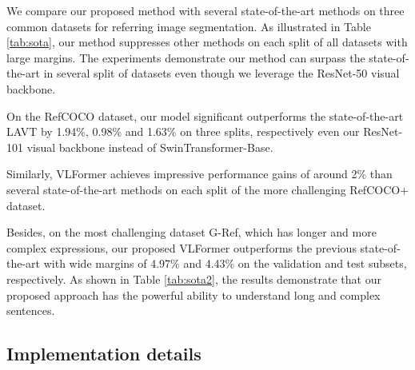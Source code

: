 


We compare our proposed method with several state-of-the-art methods on three common datasets for referring image segmentation. As illustrated in Table \ref{tab:sota}, our method suppresses other methods on each split of all datasets with large margins. The experiments demonstrate our method can surpass the state-of-the-art in several split of datasets even though we leverage the ResNet-50 visual backbone\cite{he_deep_2016}. 

On the RefCOCO dataset, our model significant outperforms the state-of-the-art LAVT\cite{yang_lavt_2022} by 1.94\%, 0.98\% and 1.63\% on three splits, respectively even our ResNet-101 visual backbone instead of SwinTransformer-Base. 

Similarly, VLFormer achieves impressive performance gains of around 2\% than several state-of-the-art methods on each split of the more challenging RefCOCO+ dataset.

Besides, on the most challenging dataset G-Ref, which has longer and more complex expressions, our proposed VLFormer outperforms the previous state-of-the-art with wide margins of 4.97\% and 4.43\% on the validation and test subsets, respectively. As shown in Table \ref{tab:sota2}, the results demonstrate that our proposed approach has the powerful ability to understand long and complex sentences. 






\subsection{Implementation details}

